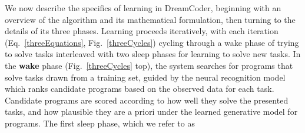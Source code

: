 \documentclass[12pt]{article}
\begin{document}
We now describe the specifics of learning in DreamCoder, beginning with an overview of the algorithm and its mathematical formulation, then turning to the details of its three phases.  Learning proceeds iteratively, %
%
with each iteration (Eq.~\ref{threeEquations}, Fig.~\ref{threeCycles}) cycling through a wake phase of trying to solve tasks %
interleaved with two sleep phases for learning to solve new tasks. %
In the {\bf wake} phase (Fig.~\ref{threeCycles} top), the system searches for programs that solve tasks drawn from a training set, %
guided by the neural recognition model which ranks candidate programs based on the observed data for each task. %
Candidate programs are scored according to how well they solve the presented tasks, and how plausible they are a priori under the learned generative model for programs.  
%
The first sleep phase, which we refer to as
\end{document}

